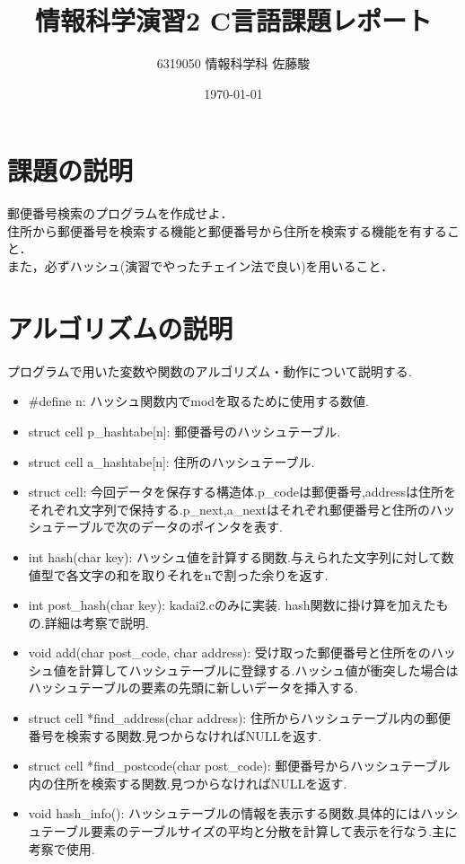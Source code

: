 \documentclass{jsarticle}
\title{情報科学演習2 C言語課題レポート}
\author{6319050 情報科学科 佐藤駿}
\date{\today}
\begin{document}
\maketitle

\newpage

\section{課題の説明}
郵便番号検索のプログラムを作成せよ．\\
住所から郵便番号を検索する機能と郵便番号から住所を検索する機能を有すること．\\
また，必ずハッシュ(演習でやったチェイン法で良い)を用いること．

\section{アルゴリズムの説明}
プログラムで用いた変数や関数のアルゴリズム・動作について説明する.
\begin{itemize}
    \item \#define n: ハッシュ関数内でmodを取るために使用する数値.
    \item struct cell \*p\_hashtabe[n]: 郵便番号のハッシュテーブル.
    \item struct cell \*a\_hashtabe[n]: 住所のハッシュテーブル.
    \item struct cell: 今回データを保存する構造体.\*p\_codeは郵便番号,\*addressは住所をそれぞれ文字列で保持する.\*p\_next,\*a\_nextはそれぞれ郵便番号と住所のハッシュテーブルで次のデータのポインタを表す.
    \item int hash(char \*key): ハッシュ値を計算する関数.与えられた文字列に対して数値型で各文字の和を取りそれをnで割った余りを返す.
    \item int post\_hash(char \*key): kadai2.cのみに実装. hash関数に掛け算を加えたもの.詳細は考察で説明.
    \item void add(char \*post\_code, char \*address): 受け取った郵便番号と住所をのハッシュ値を計算してハッシュテーブルに登録する.ハッシュ値が衝突した場合はハッシュテーブルの要素の先頭に新しいデータを挿入する.
    \item struct cell *find\_address(char \*address): 住所からハッシュテーブル内の郵便番号を検索する関数.見つからなければNULLを返す.
    \item struct cell *find\_postcode(char \*post\_code): 郵便番号からハッシュテーブル内の住所を検索する関数.見つからなければNULLを返す.
    \item void hash\_info(): ハッシュテーブルの情報を表示する関数.具体的にはハッシュテーブル要素のテーブルサイズの平均と分散を計算して表示を行なう.主に考察で使用.
\end{itemize}
\newpage
\end{document}
